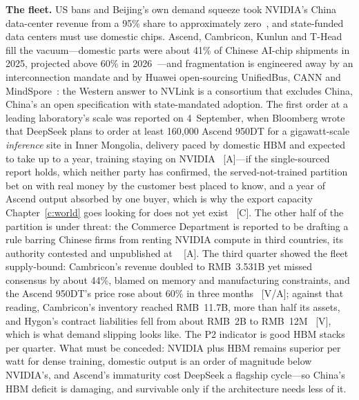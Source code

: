 \textbf{The fleet.} US bans and Beijing's own demand squeeze took NVIDIA's China data-center revenue from a 95\% share to approximately zero~\cite{nvidia-zero}, and state-funded data centers must use domestic chips. Ascend, Cambricon, Kunlun and T-Head fill the vacuum---domestic parts were about 41\% of Chinese AI-chip shipments in 2025, projected above 60\% in 2026~\cite{domestic-share}---and fragmentation is engineered away by an interconnection mandate and by Huawei open-sourcing UnifiedBus, CANN and MindSpore~\cite{huawei-ub,huawei-cann}: the Western answer to NVLink is a consortium that excludes China, China's an open specification with state-mandated adoption. The first order at a leading laboratory's scale was reported on 4~September, when Bloomberg wrote that DeepSeek plans to order at least 160,000 Ascend 950DT for a gigawatt-scale \emph{inference} site in Inner Mongolia, delivery paced by domestic HBM and expected to take up to a year, training staying on NVIDIA~\cite{deepseek-ascend-order} [A]---if the single-sourced report holds, which neither party has confirmed, the served-not-trained partition bet on with real money by the customer best placed to know, and a year of Ascend output absorbed by one buyer, which is why the export capacity Chapter~\ref{c:world} goes looking for does not yet exist~\cite{ascend-supply-ceiling} [C]. The other half of the partition is under threat: the Commerce Department is reported to be drafting a rule barring Chinese firms from renting NVIDIA compute in third countries, its authority contested and unpublished at \datafreeze~\cite{remote-access-rule} [A]. The third quarter showed the fleet supply-bound: Cambricon's revenue doubled to RMB~3.531B yet missed consensus by about 44\%, blamed on memory and manufacturing constraints, and the Ascend 950DT's price rose about 60\% in three months~\cite{hw-cambricon-q3,hw-ascend-price} [V/A]; against that reading, Cambricon's inventory reached RMB~11.7B, more than half its assets, and Hygon's contract liabilities fell from about RMB~2B to RMB~12M~\cite{hw-cn-chip-equities} [V], which is what demand slipping looks like. The P2 indicator is good HBM stacks per quarter. What must be conceded: NVIDIA plus HBM remains superior per watt for dense training, domestic output is an order of magnitude below NVIDIA's, and Ascend's immaturity cost DeepSeek a flagship cycle---so China's HBM deficit is damaging, and survivable only if the architecture needs less of it.

